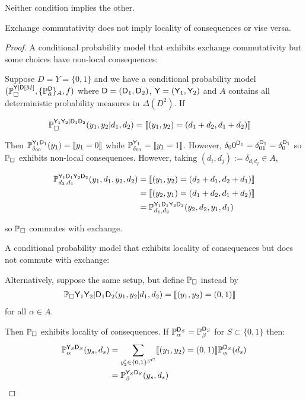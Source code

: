 Neither condition implies the other. 
\begin{lemma}
Exchange commutativity does not imply locality of consequences or vise versa.
\end{lemma}

\begin{proof}
A conditional probability model that exhibits exchange commutativity but some choices have non-local consequences:

Suppose $D=Y=\{0,1\}$ and we have a conditional probability model $(\mathbb{P}_\square^{\mathsf{Y}|\mathsf{D}[M]},\{\mathbb{P}_{\tilde{\alpha}}^{\mathsf{D}}\}_A,f)$ where $\mathsf{D}=(\mathsf{D}_1,\mathsf{D}_2)$, $\mathsf{Y}=(\mathsf{Y}_1,\mathsf{Y}_2)$ and $A$ contains all deterministic probability measures in $\Delta(D^2)$. If

\begin{align}
    \mathbb{P}_\square^{\mathsf{Y}_1\mathsf{Y}_2|\mathsf{D}_1\mathsf{D}_2}(y_1,y_2|d_1,d_2) &= \llbracket (y_1,y_2)= (d_1+d_2,d_1+d_2) \rrbracket
\end{align}

Then $\mathbb{P}_{\delta_{00}}^{\mathsf{Y}_1\mathsf{D}_1}(y_1) = \llbracket y_1=0\rrbracket$ while $\mathbb{P}_{\delta_{01}}^{\mathsf{Y}_1} = \llbracket y_1=1 \rrbracket$. However, $\delta_00^{\mathsf{D}_1}=\delta_{01}^{\mathsf{D}_1}=\delta_0^{\mathsf{D}_1}$ so $\mathbb{P}_\square$ exhibits non-local consequences. However, taking $(d_i,d_j):=\delta_{d_i d_j}\in A$,

\begin{align}
    \mathbb{P}_{d_2,d_1}^{\mathsf{Y}_1\mathsf{D}_1\mathsf{Y}_2\mathsf{D}_2}(y_1,d_1,y_2,d_2) &= \llbracket (y_1,y_2)= (d_2+d_1,d_2+d_1) \rrbracket\\
    &= \llbracket (y_2,y_1)= (d_1+d_2,d_1+d_2) \rrbracket\\
    &= \mathbb{P}_{d_1,d_2}^{\mathsf{Y}_1\mathsf{D}_1\mathsf{Y}_2\mathsf{D}_2}(y_2,d_2,y_1,d_1)
\end{align}

so $\mathbb{P}_\square$ commutes with exchange.

A conditional probability model that exhibits locality of consequences but does not commute with exchange:

Alternatively, suppose the same setup, but define $\mathbb{P}_\square$ instead by
\begin{align}
    \mathbb{P}_\square{\ensuremath{\mathsf{Y}}_1\ensuremath{\mathsf{Y}}_2|\ensuremath{\mathsf{D}}_1\ensuremath{\mathsf{D}}_2}(y_1,y_2|d_1,d_2) &= \llbracket (y_1,y_2)= (0,1) \rrbracket
\end{align}
for all $\alpha\in A$.

Then $\mathbb{P}_\square$ exhibits locality of consequences. If $\mathbb{P}_\alpha^{\mathsf{D}_S}=\mathbb{P}_\beta^{\mathsf{D}_S}$ for $S\subset\{0,1\}$ then:
\begin{align}
    \mathbb{P}_{\alpha}^{\mathsf{Y}_S\mathsf{D}_S}(y_s,d_s) &= \sum_{y'_2\in \{0,1\}^{S^C}} \llbracket (y_1,y_2)= (0,1) \rrbracket\mathbb{P}_\alpha^{\mathsf{D}_S}(d_s) \\
                                                  &= \mathbb{P}_{\beta}^{\mathsf{Y}_S\mathsf{D}_S}(y_s,d_s)
\end{align}


\end{proof}
